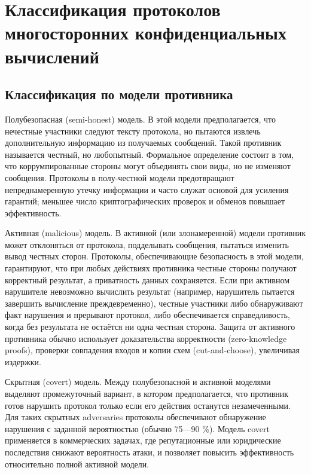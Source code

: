 \section{Классификация протоколов многосторонних конфиденциальных вычислений}
\label{sec:protocol-classification}

\subsection{Классификация по модели противника}
\label{subsec:classification-threats}

Полубезопасная (semi-\allowbreak honest) модель. В этой модели предполагается, что нечестные участники следуют тексту протокола, но пытаются извлечь дополнительную информацию из получаемых сообщений.  Такой противник называется честный, но любопытный.  Формальное определение состоит в том, что коррумпированные стороны могут объединять свои виды, но не изменяют сообщения.  Протоколы в полу-честной модели предотвращают непреднамеренную утечку информации и часто служат основой для усиления гарантий; меньшее число криптографических проверок и обменов повышает эффективность.

Активная (malicious) модель. В активной (или злонамеренной) модели противник может отклоняться от протокола, подделывать сообщения, пытаться изменить вывод честных сторон.  Протоколы, обеспечивающие безопасность в этой модели, гарантируют, что при любых действиях противника честные стороны получают корректный результат, а приватность данных сохраняется.  Если при активном нарушителе невозможно вычислить результат (например, нарушитель пытается завершить вычисление преждевременно), честные участники либо обнаруживают факт нарушения и прерывают протокол, либо обеспечивается справедливость, когда без результата не остаётся ни одна честная сторона.  Защита от активного противника обычно использует доказательства корректности (zero-knowledge proofs), проверки совпадения входов и копии схем (cut-and-choose), увеличивая издержки.

Скрытная (covert) модель. Между полубезопасной и активной моделями выделяют промежуточный вариант, в котором предполагается, что противник готов нарушить протокол только если его действия останутся незамеченными.  Для таких скрытных adversaries протоколы обеспечивают обнаружение нарушения с заданной вероятностью (обычно 75---90 \%).  Модель covert применяется в коммерческих задачах, где репутационные или юридические последствия снижают вероятность атаки, и позволяет повысить эффективность относительно полной активной модели.

